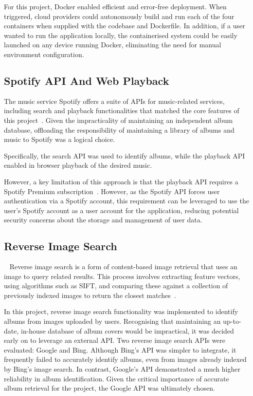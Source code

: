 For this project, Docker enabled efficient and error-free deployment. When triggered, cloud providers could autonomously build and run each of the four containers when supplied with the codebase and Dockerfile. In addition, if a user wanted to run the application locally, the containerised system could be easily launched on any device running Docker, eliminating the need for manual environment configuration.

\subsection{Spotify API And Web Playback}
The music service Spotify offers a suite of APIs for music-related services, including search and playback functionalities that matched the core features of this project~\cite{SpotifyAPI}. Given the impracticality of maintaining an independent album database, offloading the responsibility of maintaining a library of albums and music to Spotify was a logical choice.

Specifically, the search API was used to identify albums, while the playback API enabled in browser playback of the desired music.

However, a key limitation of this approach is that the playback API requires a Spotify Premium subscription~\cite{SpotifyPlaybackSDK}. However, as the Spotify API forces user authentication via a Spotify account, this requirement can be leveraged to use the user's Spotify account as a user account for the application, reducing potential security concerns about the storage and management of user data.

\subsection{Reverse Image Search}~\label{sec:reverse-image-search}
Reverse image search is a form of content-based image retrieval that uses an image to query related results. This process involves extracting feature vectors, using algorithms such as SIFT, and comparing these against a collection of previously indexed images to return the closest matches~\cite{Gaillard2017LargeSR}.

In this project, reverse image search functionality was implemented to identify albums from images uploaded by users. Recognising that maintaining an up-to-date, in-house database of album covers would be impractical, it was decided early on to leverage an external API. Two reverse image search APIs were evaluated: Google and Bing. Although Bing's API was simpler to integrate, it frequently failed to accurately identify albums, even from images already indexed by Bing's image search. In contrast, Google's API demonstrated a much higher reliability in album identification. Given the critical importance of accurate album retrieval for the project, the Google API was ultimately chosen.

